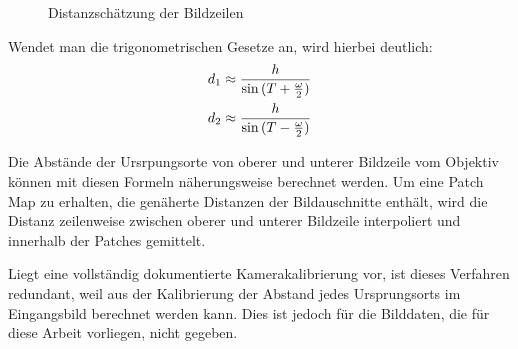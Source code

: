 \begin{figure}[h]
  \centering
  \caption{Distanzschätzung der Bildzeilen}
  \label{distanz}
\end{figure}

Wendet man die trigonometrischen Gesetze an, wird hierbei deutlich:
\begin{align}
    d_1 &\approx \frac{h}{\sin{(T + \frac{\omega}{2})}} \notag \\
    d_2 &\approx \frac{h}{\sin{(T - \frac{\omega}{2}})}
\end{align}

Die Abstände der Ursrpungsorte von oberer und unterer Bildzeile vom Objektiv können mit diesen Formeln näherungsweise berechnet werden. Um eine Patch Map zu erhalten, die genäherte Distanzen der Bildauschnitte enthält, wird die Distanz zeilenweise zwischen oberer und unterer Bildzeile interpoliert und innerhalb der Patches gemittelt. 

Liegt eine vollständig dokumentierte Kamerakalibrierung vor, ist dieses Verfahren redundant, weil aus der Kalibrierung der Abstand jedes Ursprungsorts im Eingangsbild berechnet werden kann. Dies ist jedoch für die Bilddaten, die für diese Arbeit vorliegen, nicht gegeben.



